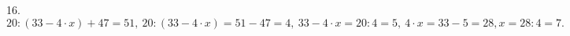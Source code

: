 16. $20:(33-4\cdot x)+47=51,\ 20:(33-4\cdot x)=51-47=4,\ 33-4\cdot x=20:4=5,\ 4\cdot x=33-5=28, x=28:4=7.$\\
